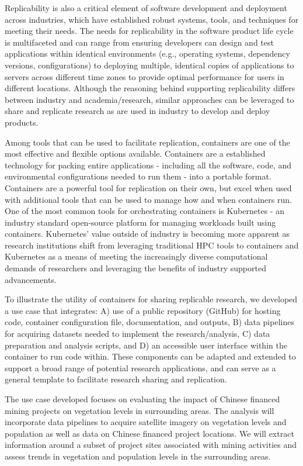 \documentclass[a4paper]{article}
\begin{document}
Replicability is also a critical element of software development and deployment across industries, which have established robust systems, tools, and techniques for meeting their needs. The needs for replicability in the software product life cycle is multifaceted and can range from ensuring developers can design and test applications within identical environments (e.g., operating systems, dependency versions, configurations) to deploying multiple, identical copies of applications to servers across different time zones to provide optimal performance for users in different locations. Although the reasoning behind supporting replicability differs between industry and academia/research, similar approaches can be leveraged to share and replicate research as are used in industry to develop and deploy products.

Among tools that can be used to facilitate replication, containers are one of the most effective and flexible options available. Containers are a established technology for packing entire applications - including all the software, code, and environmental configurations needed to run them - into a portable format\citep{containers}. Containers are a powerful tool for replication on their own, but excel when used with additional tools that can be used to manage how and when containers run. One of the most common tools for orchestrating containers is Kubernetes - an industry standard open-source platform for managing workloads built using containers\citep{k8s}. Kubernetes' value outside of industry is becoming more apparent as research institutions shift from leveraging traditional HPC tools to containers and Kubernetes as a means of meeting the increasingly diverse computational demands of researchers and leveraging the benefits of industry supported advancements.

To illustrate the utility of containers for sharing replicable research, we developed a use case that integrates: A) use of a public repository (GitHub) for hosting code, container configuration file, documentation, and outputs, B) data pipelines for acquiring datasets needed to implement the research/analysis, C) data preparation and analysis scripts, and D) an accessible user interface within the container to run code within. These components can be adapted and extended to support a broad range of potential research applications, and can serve as a general template to facilitate research sharing and replication.

The use case developed focuses on evaluating the impact of Chinese financed mining projects on vegetation levels in surrounding areas. The analysis will incorporate data pipelines to acquire satellite imagery on vegetation levels and population as well as data on Chinese financed project locations. We will extract information around a subset of project sites associated with mining activities and assess trends in vegetation and population levels in the surrounding areas. 
\end{document}
